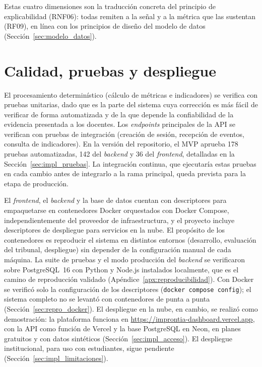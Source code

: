 Estas cuatro dimensiones son la traducción concreta del principio de explicabilidad (RNF06): todas remiten a la señal y a la métrica que las sustentan (RF09), en línea con los principios de diseño del modelo de datos (Sección~\ref{sec:modelo_datos}).

\section{Calidad, pruebas y despliegue}

El procesamiento determinístico (cálculo de métricas e indicadores) se verifica con pruebas unitarias, dado que es la parte del sistema cuya corrección es más fácil de verificar de forma automatizada y de la que depende la confiabilidad de la evidencia presentada a los docentes. Los \textit{endpoints} principales de la API se verifican con pruebas de integración (creación de sesión, recepción de eventos, consulta de indicadores). En la versión \texttt{\commitpruebas} del repositorio, el MVP aprueba 178 pruebas automatizadas, 142 del \textit{backend} y 36 del \textit{frontend}, detalladas en la Sección~\ref{sec:impl_pruebas}. La integración continua, que ejecutaría estas pruebas en cada cambio antes de integrarlo a la rama principal, queda prevista para la etapa de producción.

El \textit{frontend}, el \textit{backend} y la base de datos cuentan con descriptores para empaquetarse en contenedores Docker orquestados con Docker Compose, independientemente del proveedor de infraestructura, y el proyecto incluye descriptores de despliegue para servicios en la nube. El propósito de los contenedores es reproducir el sistema en distintos entornos (desarrollo, evaluación del tribunal, despliegue) sin depender de la configuración manual de cada máquina. La suite de pruebas y el modo producción del \textit{backend} se verificaron sobre PostgreSQL~16 con Python y Node.js instalados localmente, que es el camino de reproducción validado (Apéndice~\ref{apx:reproducibilidad}). Con Docker se verificó solo la configuración de los descriptores (\texttt{docker compose config}); el sistema completo no se levantó con contenedores de punta a punta (Sección~\ref{sec:repro_docker}). El despliegue en la nube, en cambio, se realizó como demostración: la plataforma funciona en \url{https://improntia-dashboard.vercel.app}, con la API como función de Vercel y la base PostgreSQL en Neon, en planes gratuitos y con datos sintéticos (Sección~\ref{sec:impl_acceso}). El despliegue institucional, para uso con estudiantes, sigue pendiente (Sección~\ref{sec:impl_limitaciones}).

